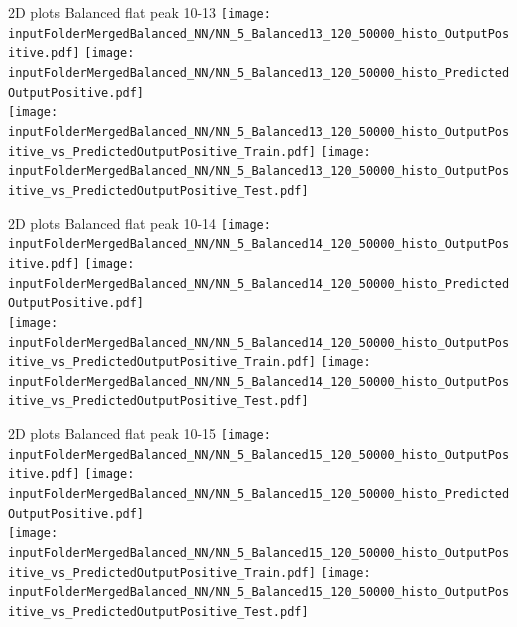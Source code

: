 \documentclass{beamer}
\begin{document}
\begin{frame}{2D plots Balanced flat peak 10-13}
\texttt{[image: \\inputFolderMergedBalanced\_NN/NN\_5\_Balanced13\_120\_50000\_histo\_OutputPositive.pdf]}
\texttt{[image: \\inputFolderMergedBalanced\_NN/NN\_5\_Balanced13\_120\_50000\_histo\_PredictedOutputPositive.pdf]}\\
\texttt{[image: \\inputFolderMergedBalanced\_NN/NN\_5\_Balanced13\_120\_50000\_histo\_OutputPositive\_vs\_PredictedOutputPositive\_Train.pdf]}
\texttt{[image: \\inputFolderMergedBalanced\_NN/NN\_5\_Balanced13\_120\_50000\_histo\_OutputPositive\_vs\_PredictedOutputPositive\_Test.pdf]}
\end{frame}
\clearpage

\begin{frame}{2D plots Balanced flat peak 10-14}
\texttt{[image: \\inputFolderMergedBalanced\_NN/NN\_5\_Balanced14\_120\_50000\_histo\_OutputPositive.pdf]}
\texttt{[image: \\inputFolderMergedBalanced\_NN/NN\_5\_Balanced14\_120\_50000\_histo\_PredictedOutputPositive.pdf]}\\
\texttt{[image: \\inputFolderMergedBalanced\_NN/NN\_5\_Balanced14\_120\_50000\_histo\_OutputPositive\_vs\_PredictedOutputPositive\_Train.pdf]}
\texttt{[image: \\inputFolderMergedBalanced\_NN/NN\_5\_Balanced14\_120\_50000\_histo\_OutputPositive\_vs\_PredictedOutputPositive\_Test.pdf]}
\end{frame}
\clearpage

\begin{frame}{2D plots Balanced flat peak 10-15}
\texttt{[image: \\inputFolderMergedBalanced\_NN/NN\_5\_Balanced15\_120\_50000\_histo\_OutputPositive.pdf]}
\texttt{[image: \\inputFolderMergedBalanced\_NN/NN\_5\_Balanced15\_120\_50000\_histo\_PredictedOutputPositive.pdf]}\\
\texttt{[image: \\inputFolderMergedBalanced\_NN/NN\_5\_Balanced15\_120\_50000\_histo\_OutputPositive\_vs\_PredictedOutputPositive\_Train.pdf]}
\texttt{[image: \\inputFolderMergedBalanced\_NN/NN\_5\_Balanced15\_120\_50000\_histo\_OutputPositive\_vs\_PredictedOutputPositive\_Test.pdf]}
\end{frame}
\clearpage
\end{document}
